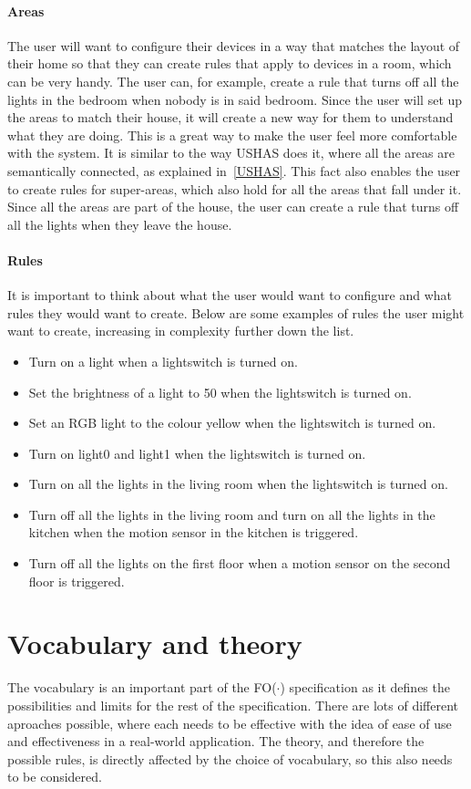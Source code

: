 \documentclass[11pt,a4paper]{report}
\newcommand{\fodot}{FO($\cdot$)\xspace}
\begin{document}
\paragraph{Areas}
The user will want to configure their devices in a way that matches the layout of their home so that they can create rules that apply to devices in a room, which can be very handy. The user can, for example, create a rule that turns off all the lights in the bedroom when nobody is in said bedroom. Since the user will set up the areas to match their house, it will create a new way for them to understand what they are doing. This is a great way to make the user feel more comfortable with the system. It is similar to the way USHAS does it, where all the areas are semantically connected, as explained in~\ref{USHAS}. This fact also enables the user to create rules for super-areas, which also hold for all the areas that fall under it. Since all the areas are part of the house, the user can create a rule that turns off all the lights when they leave the house.

\paragraph{Rules}
It is important to think about what the user would want to configure and what rules they would want to create. Below are some examples of rules the user might want to create, increasing in complexity further down the list.
\begin{itemize}
    \item Turn on a light when a lightswitch is turned on.
    \item Set the brightness of a light to 50 when the lightswitch is turned on.
    \item Set an RGB light to the colour yellow when the lightswitch is turned on.
    \item Turn on light0 and light1 when the lightswitch is turned on.
    \item Turn on all the lights in the living room when the lightswitch is turned on.
    \item Turn off all the lights in the living room and turn on all the lights in the kitchen when the motion sensor in the kitchen is triggered.
    \item Turn off all the lights on the first floor when a motion sensor on the second floor is triggered.
\end{itemize}

\section{Vocabulary and theory} 
The vocabulary is an important part of the \fodot specification as it defines the possibilities and limits for the rest of the specification. There are lots of different aproaches possible, where each needs to be effective with the idea of ease of use and effectiveness in a real-world application. The theory, and therefore the possible rules, is directly affected by the choice of vocabulary, so this also needs to be considered.
\end{document}
